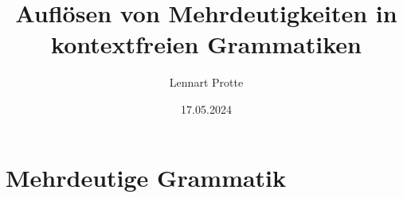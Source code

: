 \documentclass[t]{beamer}
\begin{document}

	\title{Auflösen von Mehrdeutigkeiten in kontextfreien Grammatiken}
	\date{17.05.2024}
	\author{Lennart Protte}

	\frame{\titlepage}


	\section{Mehrdeutige Grammatik}\label{sec:mehrdeutige-grammatik2}
\end{document}
